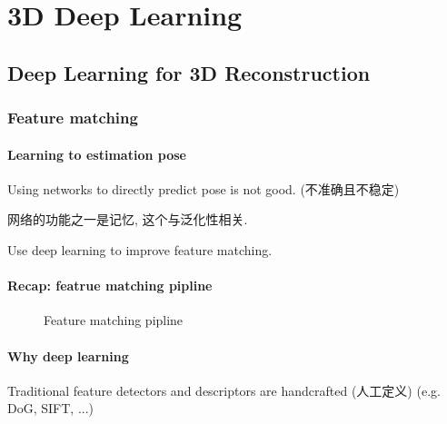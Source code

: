 \chapter{3D Deep Learning}

\section{Deep Learning for 3D Reconstruction}

\subsection{Feature matching}

\subsubsection{Learning to estimation pose}
Using networks to directly predict pose is not good. (不准确且不稳定)

网络的功能之一是记忆, 这个与泛化性相关. 

Use deep learning to improve feature matching. 

\subsubsection{Recap: featrue matching pipline}

\begin{figure}[H]
    \centering
    \caption{Feature matching pipline}
\end{figure}

\subsubsection{Why deep learning}

Traditional feature detectors and descriptors are handcrafted (人工定义) (e.g. DoG, SIFT, ...)

